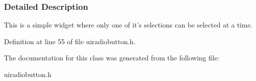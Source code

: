 \subsubsection{Detailed Description}
This is a simple widget where only one of it's selections can be selected at a time. 

Definition at line 55 of file uiradiobutton.h.



The documentation for this class was generated from the following file:\begin{DoxyCompactItemize}
\item 
uiradiobutton.h\end{DoxyCompactItemize}
